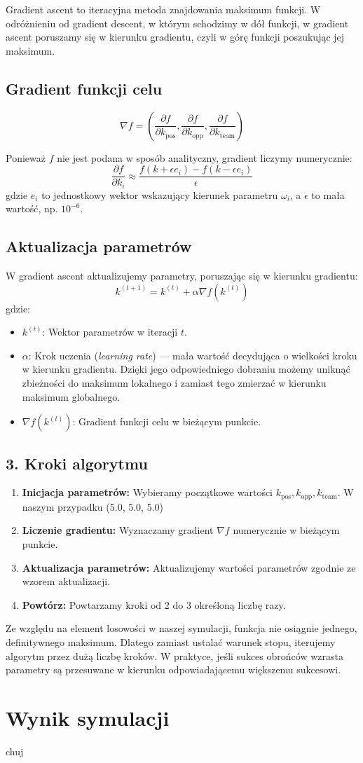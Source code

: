 \documentclass{article}
\begin{document}
Gradient ascent to iteracyjna metoda znajdowania maksimum funkcji. W odróżnieniu od gradient descent, w którym schodzimy w dół funkcji, w gradient ascent poruszamy się w kierunku gradientu, czyli w górę funkcji poszukując jej maksimum.

\subsection*{Gradient funkcji celu}

\[
\nabla f = \left( \frac{\partial f}{\partial k_{\text{pos}}}, \frac{\partial f}{\partial k_{\text{opp}}}, \frac{\partial f}{\partial k_{\text{team}}} \right)
\]

Ponieważ \(f\) nie jest podana w sposób analityczny, gradient liczymy numerycznie:
\[
\frac{\partial f}{\partial k_i} \approx \frac{f(k + \epsilon e_i) - f(k - \epsilon e_i)}{\epsilon}
\]
gdzie \(e_i\) to jednostkowy wektor wskazujący kierunek parametru \(\omega_i\), a \(\epsilon\) to mała wartość, np. \(10^{-6}\).

\subsection*{Aktualizacja parametrów}
W gradient ascent aktualizujemy parametry, poruszając się w kierunku gradientu:
\[
k^{(t+1)} = k^{(t)} + \alpha \nabla f(k^{(t)})
\]
gdzie:
\begin{itemize}
    \item \(k^{(t)}\): Wektor parametrów w iteracji \(t\).
    \item \(\alpha\): Krok uczenia (\textit{learning rate}) — mała wartość decydująca o wielkości kroku w kierunku gradientu. Dzięki jego odpowiedniego dobraniu możemy uniknąć zbieżności do maksimum lokalnego i zamiast tego zmierzać w kierunku maksimum globalnego.
    \item \(\nabla f(k^{(t)})\): Gradient funkcji celu w bieżącym punkcie.
\end{itemize}

\subsection*{3. Kroki algorytmu}
\begin{enumerate}
    \item \textbf{Inicjacja parametrów:} Wybieramy początkowe wartości \(k_{\text{pos}}, k_{\text{opp}}, k_{\text{team}}\). W naszym przypadku (5.0, 5.0, 5.0)
    \item \textbf{Liczenie gradientu:} Wyznaczamy gradient \(\nabla f\) numerycznie w bieżącym punkcie.
    \item \textbf{Aktualizacja parametrów:} Aktualizujemy wartości parametrów zgodnie ze wzorem aktualizacji.
    \item \textbf{Powtórz:} Powtarzamy kroki od 2 do 3 określoną liczbę razy.
\end{enumerate}
Ze względu na element losowości w naszej symulacji, funkcja nie osiągnie jednego, definitywnego maksimum. Dlatego zamiast ustalać warunek stopu, iterujemy algorytm przez dużą liczbę kroków. W praktyce, jeśli sukces obrońców wzrasta parametry są przesuwane w kierunku odpowiadającemu większemu sukcesowi.


\section*{Wynik symulacji}
chuj
\end{document}
